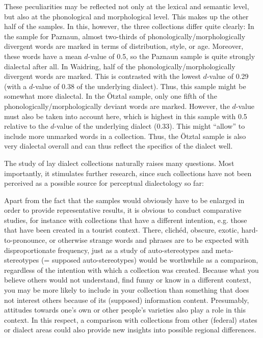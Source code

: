 \documentclass[output=paper]{langscibook}
\begin{document}
These peculiarities may be reflected not only at the lexical and semantic level, but also at the phonological and morphological level. This makes up the other half of the samples. In this, however, the three collections differ quite clearly: In the sample for Paznaun, almost two-thirds of phonologically/morphologically divergent words are marked in terms of distribution, style, or age. Moreover, these words have a mean $d$-value of 0.5, so the Paznaun sample is quite strongly dialectal after all. In Waidring, half of the phonologically/morphologically divergent words are marked. This is contrasted with the lowest $d$-value of 0.29 (with a $d$-value of 0.38 of the underlying dialect). Thus, this sample might be somewhat more dialectal. In the Ötztal sample, only one fifth of the phonologically/morphologically deviant words are marked. However, the $d$-value must also be taken into account here, which is highest in this sample with 0.5 relative to the $d$-value of the underlying dialect (0.33). This might “allow” to include more unmarked words in a collection. Thus, the Ötztal sample is also very dialectal overall and can thus reflect the specifics of the dialect well.

The study of lay dialect collections naturally raises many questions. Most importantly, it stimulates further research, since such collections have not been perceived as a possible source for perceptual dialectology so far:

Apart from the fact that the samples would obviously have to be enlarged in order to provide representative results, it is obvious to conduct comparative studies, for instance with collections that have a different intention, e.g. those that have been created in a tourist context. There, clichéd, obscure, exotic, hard-to-pronounce, or otherwise strange words and phrases are to be expected with disproportionate frequency, just as a study of auto-stereotypes and meta\hyp stereotypes (= supposed auto-stereotypes) would be worthwhile as a comparison, regardless of the intention with which a collection was created. Because what you believe others would not understand, find funny or know in a different context, you may be more likely to include in your collection than something that does not interest others because of its (supposed) information content. Presumably, attitudes towards one’s own or other people’s varieties also play a role in this context. In this respect, a comparison with collections from other (federal) states or dialect areas could also provide new insights into possible regional differences.
\end{document}

